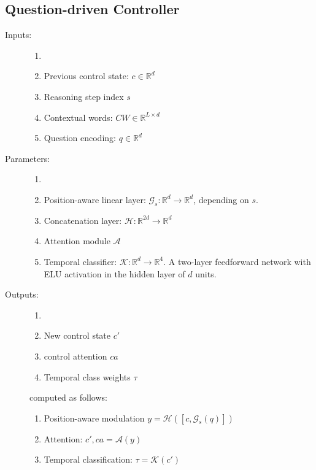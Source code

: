 \documentclass{article}
\theoremstyle{remark}
\theoremstyle{definition}
\newcommand{\Reals}{\mathbb{R}}
\newcommand{\cA}{\mathcal{A}}
\newcommand{\cG}{\mathcal{G}}
\newcommand{\cK}{\mathcal{K}}
\newcommand{\cH}{\mathcal{H}}
\begin{document}
\subsection{Question-driven Controller}
\begin{description}
	\item[Inputs:] 
	\begin{enumerate}
		\item[]
		\item Previous control state: $c \in \Reals^d$	
		\item Reasoning step index $s$
		\item Contextual words: $CW \in \Reals^{L \times d}$
		\item Question encoding: $q \in \Reals^d$	
	\end{enumerate}
	
	\item[Parameters:] 
	\begin{enumerate}
		\item[]
		\item Position-aware linear layer: $\cG_s: \Reals^d \to \Reals^d$, depending on $s$.
		\item Concatenation layer: $\cH: \Reals^{2d} \to \Reals^d$
		\item Attention module $\cA$
		\item Temporal classifier:  $\cK: \Reals^d \to \Reals^4$. A two-layer feedforward
		network with ELU activation in the hidden layer of $d$ units.	
	\end{enumerate}
	
	\item[Outputs:] 
	\begin{enumerate}
		\item[]
		\item New control state $c'$
		\item control attention $ca$
		\item Temporal class weights $\tau$
    \end{enumerate}
	computed as follows:
\begin{enumerate}[label=\emph{\roman*})]
	\item Position-aware modulation $y = \cH([c, \cG_s(q)])$
	\item Attention: $c', ca = \cA(y)$
	\item Temporal classification: $\tau = \cK(c')$
\end{enumerate}
\end{description}
\end{document}
